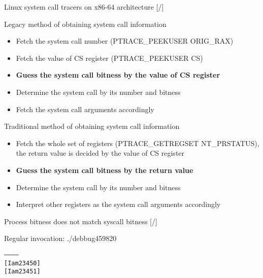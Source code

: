 \documentclass[unicode,aspectratio=169,xcolor={table,dvipsnames,usernames}]{beamer}
\begin{document}
\begin{frame}{Linux system call tracers on x86-64 architecture \hfill [\insertframenumber/\inserttotalframenumber]}
\begin{block}{Legacy method of obtaining system call information}
\begin{itemize}
	\item Fetch the system call number (PTRACE\_PEEKUSER ORIG\_RAX)
	\item Fetch the value of CS register (PTRACE\_PEEKUSER CS)
	\item {\bf Guess the system call bitness by the value of CS register}
	\item Determine the system call by its number and bitness
	\item Fetch the system call arguments accordingly
\end{itemize}
\end{block}

\begin{block}{Traditional method of obtaining system call information}
\begin{itemize}
	\item Fetch the whole set of registers (PTRACE\_GETREGSET NT\_PRSTATUS), \\
		the return value is decided by the value of CS register
	\item {\bf Guess the system call bitness by the return value}
	\item Determine the system call by its number and bitness
	\item Interpret other registers as the system call arguments accordingly
\end{itemize}
\end{block}
\end{frame}

\begin{frame}[fragile]{Process bitness does not match syscall bitness \hfill [\insertframenumber/\inserttotalframenumber]}
\large
{}

\begin{block}{Regular invocation: ./debbug459820}
\begin{alltt}
------------
[I am 23450]
[I am 23451]
\end{alltt}
\end{block}
\end{frame}
\end{document}
